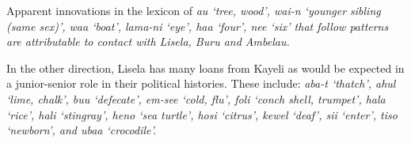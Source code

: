 Apparent innovations in the lexicon of \it{au} ‘tree,
wood’, \it{wai-n} ‘younger sibling (same sex)’,
\it{waa} ‘boat’, \it{lama-ni} ‘eye’,
\it{haa} ‘four’, \it{nee} ‘six’ that follow  patterns
are attributable to contact with Lisela, Buru and Ambelau.

In the other direction,
Lisela has many loans from Kayeli as would be expected in a junior-senior
role in their political histories.
These include: \it{aba-t} ‘thatch’,
\it{ahul} ‘lime, chalk’, \it{buu} ‘defecate’, \it{em-see} ‘cold,
flu’, \it{foli} ‘conch shell, trumpet’,
\it{hala} ‘rice’, \it{hali} ‘stingray’,
\it{heno} ‘sea turtle’, \it{hosi} ‘citrus’,
\it{kewel} ‘deaf’, \it{sii} ‘enter’,
\it{tiso} ‘newborn’, and \it{ubaa} ‘crocodile’.


